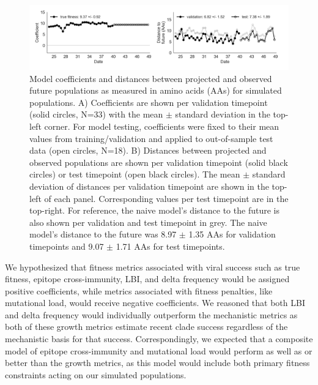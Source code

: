 \begin{figure}[ht!]
  \begin{center}
  \includegraphics[width=\textwidth]{figures/unadjusted-model-accuracy-and-coefficients-for-simulated-populations-controls.png}
  \caption{
    Model coefficients and distances between projected and observed future populations as measured in amino acids (AAs) for simulated populations.
    A) Coefficients are shown per validation timepoint (solid circles, N=33) with the mean $\pm$ standard deviation in the top-left corner.
    For model testing, coefficients were fixed to their mean values from training/validation and applied to out-of-sample test data (open circles, N=18).
    B) Distances between projected and observed populations are shown per validation timepoint (solid black circles) or test timepoint (open black circles).
    The mean $\pm$ standard deviation of distances per validation timepoint are shown in the top-left of each panel.
    Corresponding values per test timepoint are in the top-right.
    For reference, the naive model's distance to the future is also shown per validation and test timepoint in grey.
    The naive model's distance to the future was 8.97 $\pm$ 1.35 AAs for validation timepoints and 9.07 $\pm$ 1.71 AAs for test timepoints.
  }
  \label{fig:unadjusted_model_accuracy_and_coefficients_for_simulated_populations_controls}
  \end{center}
\end{figure}

We hypothesized that fitness metrics associated with viral success such as true fitness, epitope cross-immunity, LBI, and delta frequency would be assigned positive coefficients, while metrics associated with fitness penalties, like mutational load, would receive negative coefficients.
We reasoned that both LBI and delta frequency would individually outperform the mechanistic metrics as both of these growth metrics estimate recent clade success regardless of the mechanistic basis for that success.
Correspondingly, we expected that a composite model of epitope cross-immunity and mutational load would perform as well as or better than the growth metrics, as this model would include both primary fitness constraints acting on our simulated populations.

